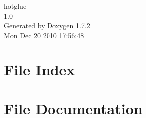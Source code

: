 \documentclass[a4paper]{book}
\begin{document}
\hypersetup{pageanchor=false}
\begin{titlepage}
\vspace*{7cm}
\begin{center}
{\Large hotglue \\[1ex]\large 1.0 }\\
\vspace*{1cm}
{\large Generated by Doxygen 1.7.2}\\
\vspace*{0.5cm}
{\small Mon Dec 20 2010 17:56:48}\\
\end{center}
\end{titlepage}
\clearemptydoublepage
{}
\tableofcontents
\clearemptydoublepage
{}
\hypersetup{pageanchor=true}
\chapter{File Index}

\chapter{File Documentation}























\printindex
\end{document}
